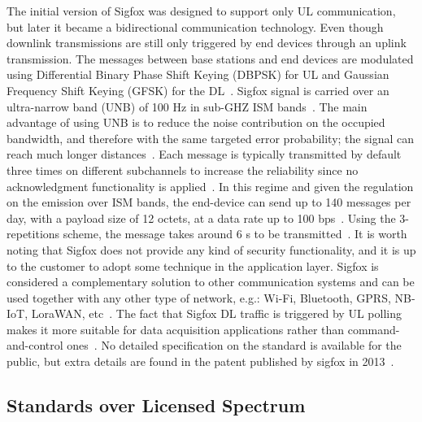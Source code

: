 \documentclass[]{IEEEtran}
\begin{document}
The initial version of Sigfox was designed to support only UL communication, but later it became a bidirectional communication technology.
Even though downlink transmissions are still only triggered by end devices through an uplink transmission\cite{ding_iot_2020}.
The messages between base stations and end devices are modulated using Differential Binary Phase Shift Keying (DBPSK) for UL and Gaussian Frequency Shift Keying (GFSK) for the DL~\cite{kalfus2016ultra}.
Sigfox signal is carried over an ultra-narrow band (UNB) of 100 Hz in sub-GHZ ISM bands~\cite{mekki2019comparative}.
The main advantage of using UNB is to reduce the noise contribution on the occupied bandwidth, and therefore with the same targeted error probability; the signal can reach much longer distances~\cite{do2014interference}.
Each message is typically transmitted by default three times on different subchannels to increase the reliability since no acknowledgment functionality is applied~\cite{margelis2015low}.
In this regime and given the regulation on the emission over ISM bands, the end-device can send up to 140 messages per day, with a payload size of 12 octets, at a data rate up to 100 bps~\cite{augustin2016study}.
Using the 3-repetitions scheme, the message takes around 6 s to be transmitted~\cite{kalfus2016ultra}.
It is worth noting that Sigfox does not provide any kind of security functionality, and it is up to the customer to adopt some technique in the application layer\cite{margelis2015low}.
Sigfox is considered a complementary solution to other communication systems and can be used together with any other type of network, e.g.: Wi-Fi, Bluetooth, GPRS, NB-IoT, LoraWAN, etc~\cite{noauthor_what_nodate}.
The fact that Sigfox DL traffic is triggered by UL polling makes it more suitable for data acquisition applications rather than command-and-control ones~\cite{augustin2016study}.
No detailed specification on the standard is available for the public, but extra details are found in the patent published by sigfox in 2013~\cite{vertesMethodTransmittingUseful2017}.



\subsection{Standards over Licensed Spectrum}
\label{sec:2-2}
\end{document}
